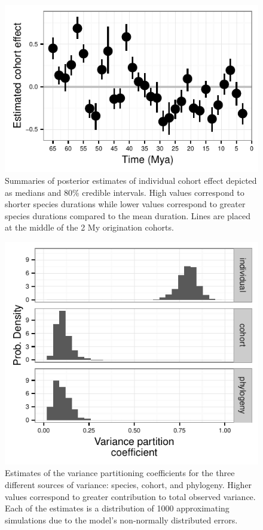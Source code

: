 \documentclass[12pt]{article}
\begin{document}
\begin{figure}[ht]
  \centering
  \includegraphics[height = 0.5\textheight, width = \textwidth, keepaspectratio = true]{figure/cohort_est}
  \caption{Summaries of posterior estimates of individual cohort effect depicted as medians and 80\% credible intervals. High values correspond to shorter species durations while lower values correspond to greater species durations compared to the mean duration. Lines are placed at the middle of the 2 My origination cohorts.}
  \label{fig:eff_cohort}
\end{figure}

\begin{figure}[ht]
  \centering
  \includegraphics[height = 0.5\textheight, width = \textwidth, keepaspectratio = true]{figure/variance_est}
  \caption{Estimates of the variance partitioning coefficients for the three different sources of variance: species, cohort, and phylogeny. Higher values correspond to greater contribution to total observed variance. Each of the estimates is a distribution of 1000 approximating simulations due to the model's non-normally distributed errors.}
  \label{fig:vpc}
\end{figure}
\end{document}
